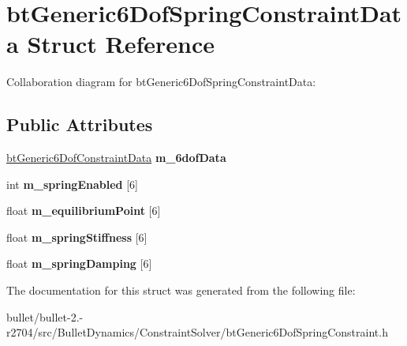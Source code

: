 \hypertarget{structbt_generic6_dof_spring_constraint_data}{\section{bt\+Generic6\+Dof\+Spring\+Constraint\+Data Struct Reference}
\label{structbt_generic6_dof_spring_constraint_data}
}


Collaboration diagram for bt\+Generic6\+Dof\+Spring\+Constraint\+Data\+:
\subsection*{Public Attributes}
\begin{DoxyCompactItemize}
\item 
\hypertarget{structbt_generic6_dof_spring_constraint_data_a033219c3bd37c0dad9609f23c12ebb69}{\hyperlink{structbt_generic6_dof_constraint_data}{bt\+Generic6\+Dof\+Constraint\+Data} {\bfseries m\+\_\+6dof\+Data}}\label{structbt_generic6_dof_spring_constraint_data_a033219c3bd37c0dad9609f23c12ebb69}

\item 
\hypertarget{structbt_generic6_dof_spring_constraint_data_a267ed73720e526722cda4d5a8c34fa03}{int {\bfseries m\+\_\+spring\+Enabled} \mbox{[}6\mbox{]}}\label{structbt_generic6_dof_spring_constraint_data_a267ed73720e526722cda4d5a8c34fa03}

\item 
\hypertarget{structbt_generic6_dof_spring_constraint_data_aca07f87b2e1f4bb8b21dc1078fddff77}{float {\bfseries m\+\_\+equilibrium\+Point} \mbox{[}6\mbox{]}}\label{structbt_generic6_dof_spring_constraint_data_aca07f87b2e1f4bb8b21dc1078fddff77}

\item 
\hypertarget{structbt_generic6_dof_spring_constraint_data_a9cb2cf5afce63edde09931fe852803c9}{float {\bfseries m\+\_\+spring\+Stiffness} \mbox{[}6\mbox{]}}\label{structbt_generic6_dof_spring_constraint_data_a9cb2cf5afce63edde09931fe852803c9}

\item 
\hypertarget{structbt_generic6_dof_spring_constraint_data_ad4558261af52c41ef6f69fe49d4f8a10}{float {\bfseries m\+\_\+spring\+Damping} \mbox{[}6\mbox{]}}\label{structbt_generic6_dof_spring_constraint_data_ad4558261af52c41ef6f69fe49d4f8a10}

\end{DoxyCompactItemize}


The documentation for this struct was generated from the following file\+:\begin{DoxyCompactItemize}
\item 
bullet/bullet-\/2.-\/r2704/src/\+Bullet\+Dynamics/\+Constraint\+Solver/bt\+Generic6\+Dof\+Spring\+Constraint.\+h\end{DoxyCompactItemize}
